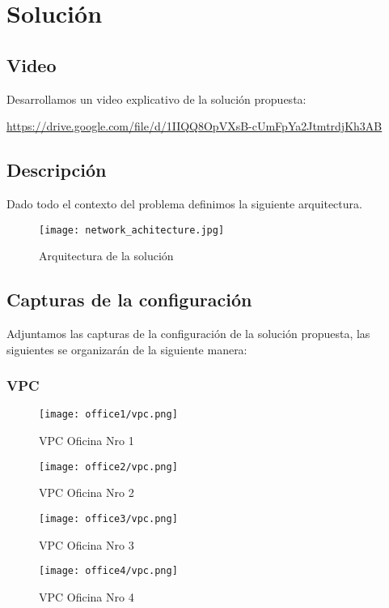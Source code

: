 \section{Solución}

\subsection{Video}
Desarrollamos un video explicativo de la solución propuesta:

\href{https://drive.google.com/file/d/1IIQQ8OpVXsB-cUmFpYa2JtmtrdjKh3AB}{https://drive.google.com/file/d/1IIQQ8OpVXsB-cUmFpYa2JtmtrdjKh3AB}

\subsection{Descripción}
Dado todo el contexto del problema definimos la siguiente arquitectura.

\begin{figure}[h]
    \centering
    \texttt{[image: network\_achitecture.jpg]}
    \caption{Arquitectura de la solución}
\end{figure}

\subsection{Capturas de la configuración}
Adjuntamos las capturas de la configuración de la solución propuesta,
las siguientes se organizarán de la siguiente manera:

\subsubsection{VPC}
\begin{figure}[h!]
    \centering
    \texttt{[image: office1/vpc.png]}
    \caption{VPC Oficina Nro 1}
\end{figure}
\begin{figure}[h!]
    \centering
    \texttt{[image: office2/vpc.png]}
    \caption{VPC Oficina Nro 2}
\end{figure}
\begin{figure}[h!]
    \centering
    \texttt{[image: office3/vpc.png]}
    \caption{VPC Oficina Nro 3}
\end{figure}
\begin{figure}[h!]
    \centering
    \texttt{[image: office4/vpc.png]}
    \caption{VPC Oficina Nro 4}
\end{figure}


